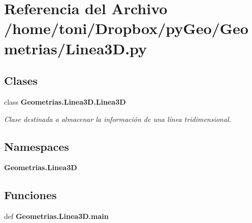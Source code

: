 \section{Referencia del Archivo /home/toni/\-Dropbox/py\-Geo/\-Geometrias/\-Linea3\-D.py}
\label{Linea3D_8py}
\subsection*{Clases}
\begin{DoxyCompactItemize}
\item 
class {\bf Geometrias.\-Linea3\-D.\-Linea3\-D}
\begin{DoxyCompactList}\small\item\em Clase destinada a almacenar la información de una línea tridimensional. \end{DoxyCompactList}\end{DoxyCompactItemize}
\subsection*{Namespaces}
\begin{DoxyCompactItemize}
\item 
{\bf Geometrias.\-Linea3\-D}
\end{DoxyCompactItemize}
\subsection*{Funciones}
\begin{DoxyCompactItemize}
\item 
def {\bf Geometrias.\-Linea3\-D.\-main}
\end{DoxyCompactItemize}
